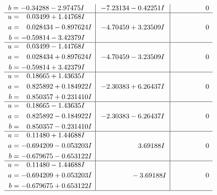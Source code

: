 \documentclass[1p]{elsarticle_modified}
\theoremstyle{definition}
\begin{document}
$$\begin{array}{c|c|c}
\begin{aligned}
b &= -0.34288 - 2.97475 I\end{aligned}
 & -7.23134 - 0.42251 I & \phantom{-0.000000 } 0 \\ \hline\begin{aligned}
u &= \phantom{-}0.03499 + 1.44768 I \\
a &= \phantom{-}0.028434 - 0.897624 I \\
b &= -0.59814 - 3.42379 I\end{aligned}
 & -4.70459 + 3.23509 I & \phantom{-0.000000 } 0 \\ \hline\begin{aligned}
u &= \phantom{-}0.03499 - 1.44768 I \\
a &= \phantom{-}0.028434 + 0.897624 I \\
b &= -0.59814 + 3.42379 I\end{aligned}
 & -4.70459 - 3.23509 I & \phantom{-0.000000 } 0 \\ \hline\begin{aligned}
u &= \phantom{-}0.18665 + 1.43635 I \\
a &= \phantom{-}0.825892 + 0.184922 I \\
b &= \phantom{-}0.850357 + 0.231410 I\end{aligned}
 & -2.30383 + 6.26437 I & \phantom{-0.000000 } 0 \\ \hline\begin{aligned}
u &= \phantom{-}0.18665 - 1.43635 I \\
a &= \phantom{-}0.825892 - 0.184922 I \\
b &= \phantom{-}0.850357 - 0.231410 I\end{aligned}
 & -2.30383 - 6.26437 I & \phantom{-0.000000 } 0 \\ \hline\begin{aligned}
u &= \phantom{-}0.11480 + 1.44688 I \\
a &= -0.694209 - 0.053203 I \\
b &= -0.679675 - 0.653122 I\end{aligned}
 & \phantom{-0.000000 -}3.69188 I & \phantom{-0.000000 } 0 \\ \hline\begin{aligned}
u &= \phantom{-}0.11480 - 1.44688 I \\
a &= -0.694209 + 0.053203 I \\
b &= -0.679675 + 0.653122 I\end{aligned}
 & \phantom{-0.000000 } -3.69188 I & \phantom{-0.000000 } 0\\
 \hline 
 \end{array}$$\newpage$$\begin{array}{c|c|c}  

\end{array}$$
\end{document}
